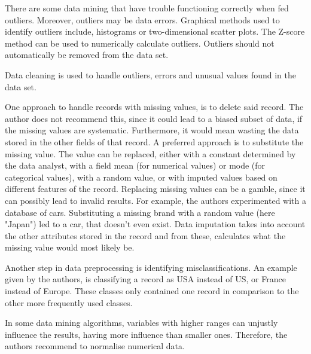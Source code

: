 There are some data mining that have trouble functioning correctly when fed outliers. Moreover, outliers may be data errors. Graphical methods used to identify outliers include, histograms or two-dimensional scatter plots.
The Z-score method can be used to numerically calculate outliers. Outliers should not automatically be removed from the data set.

Data cleaning is used to handle outliers, errors and unusual values found in the data set.

One approach to handle records with missing values, is to delete said record. The author does not recommend this, since it could lead to a biased subset of data, if the missing values are systematic. Furthermore, it would mean wasting the data stored in the other fields of that record. A preferred approach is to substitute the missing value. The value can be replaced, either with a constant determined by the data analyst, with a field mean (for numerical values) or mode (for categorical values), with a random value, or with imputed values based on different features of the record. Replacing missing values can be a gamble, since it can possibly lead to invalid results. For example, the authors experimented with a database of cars. Substituting a missing brand with a random value (here "Japan") led to a car, that doesn't even exist. Data imputation takes into account the other attributes stored in the record and from these, calculates what the missing value would most likely be.

Another step in data preprocessing is identifying misclassifications. An example given by the authors, is classifying a record as USA instead of US, or France instead of Europe. These classes only contained one record in comparison to the other more frequently used classes.


In some data mining algorithms, variables with higher ranges can unjustly influence the results, having more influence than smaller ones. Therefore, the authors recommend to normalise numerical data. 

